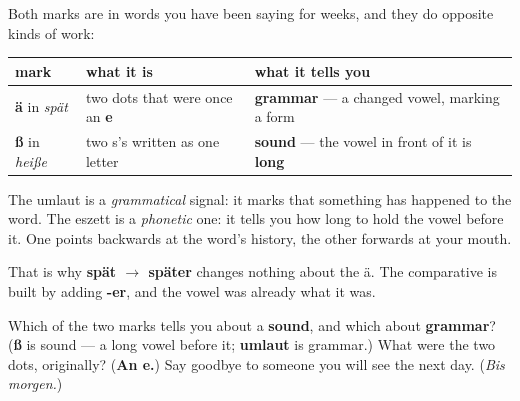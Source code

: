 \begin{grammarlens}[title={Grammar Lens: two marks, two different jobs}]
Both marks are in words you have been saying for weeks, and they do opposite kinds of work:

\noindent
\begin{tabularx}{\linewidth}{@{}>{\raggedright\arraybackslash}X>{\raggedright\arraybackslash}X>{\raggedright\arraybackslash}X@{}}
\toprule
\textbf{mark} & \textbf{what it is} & \textbf{what it tells you} \\
\midrule
\textbf{ä} in \emph{spät} & two dots that were once an \textbf{e} & \textbf{grammar} — a changed vowel, marking a form \\
\textbf{ß} in \emph{heiße} & two s's written as one letter & \textbf{sound} — the vowel in front of it is \textbf{long} \\
\bottomrule
\end{tabularx}

The umlaut is a \emph{grammatical} signal: it marks that something has happened to the word. The eszett is a \emph{phonetic} one: it tells you how long to hold the vowel before it. One points backwards at the word's history, the other forwards at your mouth.

That is why \textbf{spät $\to$ später} changes nothing about the ä. The comparative is built by adding \textbf{-er}, and the vowel was already what it was.
\end{grammarlens}

\begin{tcolorbox}[breakable,colback=teal!4,colframe=teal!35!black,title={Before you move on}]
Which of the two marks tells you about a \textbf{sound}, and which about \textbf{grammar}? (\textbf{ß} is sound — a long vowel before it; \textbf{umlaut} is grammar.) What were the two dots, originally? (\textbf{An e.}) Say goodbye to someone you will see the next day. (\emph{Bis morgen.})
\end{tcolorbox}
